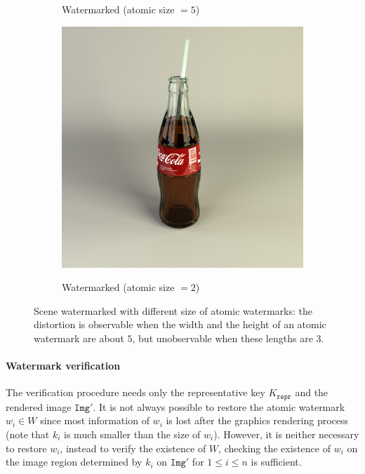 \documentclass[a4paper,11pt,onecolumn]{memoir}
\begin{document}
\begin{figure}[ht]
\begin{subfigure}[b]{0.45\textwidth}
        \label{subfig:coca_cola_wm_ko}
        \caption{Watermarked (atomic size $= 5$)}
    \end{subfigure}
    \vfill
    \begin{subfigure}[b]{0.45\textwidth}
        \includegraphics[width=\textwidth]{coca_cola_wm_ok.png}
        \label{subfig:coca_cola_wm_ok}
        \caption{Watermarked (atomic size $= 2$)}
    \end{subfigure}
    \caption[Scene watermarked with different sizes of atomic watermarks]{Scene watermarked with different size of atomic watermarks: the distortion is observable when the width and the height of an atomic watermark are about $5$, but unobservable when these lengths are $3$.}
    \label{fig:coca_cola}
\end{figure}

\paragraph[Watermark verification]{Watermark verification}
The verification procedure needs only the representative key $K_\mathtt{repr}$ and the rendered image $\mathtt{Img'}$. It is not always possible to restore the atomic watermark $w_i \in W$ since most information of $w_i$ is lost after the graphics rendering process (note that $k_i$ is much smaller than the size of $w_i$). However, it is neither necessary to restore $w_i$, instead to verify the existence of $W$, checking the existence of $w_i$ on the image region determined by $k_i$ on $\mathtt{Img'}$ for $1 \leq i \leq n$ is sufficient.
\end{document}
